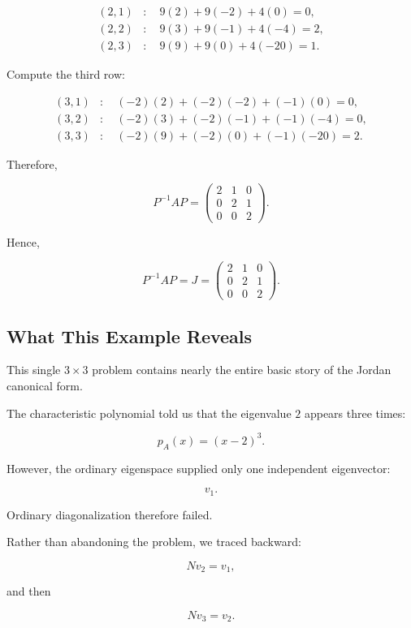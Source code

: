 \documentclass[11pt]{article}
\begin{document}
\[
\begin{aligned}
(2,1)&:\quad 9(2)+9(-2)+4(0)=0,\\
(2,2)&:\quad 9(3)+9(-1)+4(-4)=2,\\
(2,3)&:\quad 9(9)+9(0)+4(-20)=1.
\end{aligned}
\]

Compute the third row:

\[
\begin{aligned}
(3,1)&:\quad (-2)(2)+(-2)(-2)+(-1)(0)=0,\\
(3,2)&:\quad (-2)(3)+(-2)(-1)+(-1)(-4)=0,\\
(3,3)&:\quad (-2)(9)+(-2)(0)+(-1)(-20)=2.
\end{aligned}
\]

Therefore,

\[
P^{-1}AP
=
\begin{pmatrix}
2&1&0\\
0&2&1\\
0&0&2
\end{pmatrix}.
\]

Hence,

\[
\boxed{
P^{-1}AP
=
J
=
\begin{pmatrix}
2&1&0\\
0&2&1\\
0&0&2
\end{pmatrix}.
}
\]


\subsection{What This Example Reveals}

This single \(3\times3\) problem contains nearly the entire basic story
of the Jordan canonical form.

The characteristic polynomial told us that the eigenvalue \(2\)
appears three times:

\[
p_A(x)=(x-2)^3.
\]

However, the ordinary eigenspace supplied only one independent
eigenvector:

\[
v_1.
\]

Ordinary diagonalization therefore failed.

Rather than abandoning the problem, we traced backward:

\[
Nv_2=v_1,
\]

and then

\[
Nv_3=v_2.
\]
\end{document}
